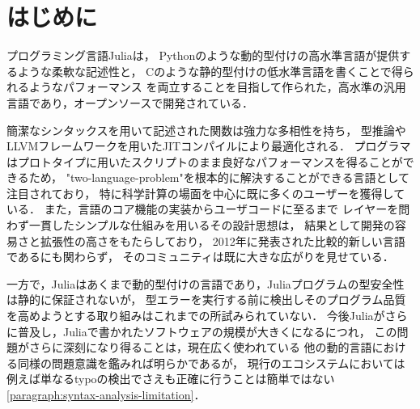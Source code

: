 
\section{はじめに}

プログラミング言語Julia\cite{julia}は，
Pythonのような動的型付けの高水準言語が提供するような柔軟な記述性と，
Cのような静的型付けの低水準言語を書くことで得られるようなパフォーマンス
を両立することを目指して作られた，高水準の汎用言語であり，オープンソースで開発されている．

簡潔なシンタックスを用いて記述された関数は強力な多相性を持ち，
型推論やLLVMフレームワークを用いたJITコンパイルにより最適化される．
プログラマはプロトタイプに用いたスクリプトのまま良好なパフォーマンスを得ることができるため，
"two-language-problem"\footnotemark を根本的に解決することができる言語として注目されており，
特に科学計算の場面を中心に既に多くのユーザーを獲得している\cite{julia-growth}．
また，言語のコア機能の実装からユーザコードに至るまで
レイヤーを問わず一貫したシンプルな仕組みを用いるその設計思想は，
結果として開発の容易さと拡張性の高さをもたらしており，
2012年に発表された比較的新しい言語であるにも関わらず，
そのコミュニティは既に大きな広がりを見せている．


一方で，Juliaはあくまで動的型付けの言語であり，Juliaプログラムの型安全性は静的に保証されないが，
型エラーを実行する前に検出しそのプログラム品質を高めようとする取り組みはこれまでの所試みられていない．
今後Juliaがさらに普及し，Juliaで書かれたソフトウェアの規模が大きくになるにつれ，
この問題がさらに深刻になり得ることは，現在広く使われている
他の動的言語における同様の問題意識を鑑みれば明らかであるが\cite{ruby-progress-report}，
現行のエコシステムにおいては例えば単なるtypoの検出でさえも正確に行うことは簡単ではない\ref{paragraph:syntax-analysis-limitation}．

